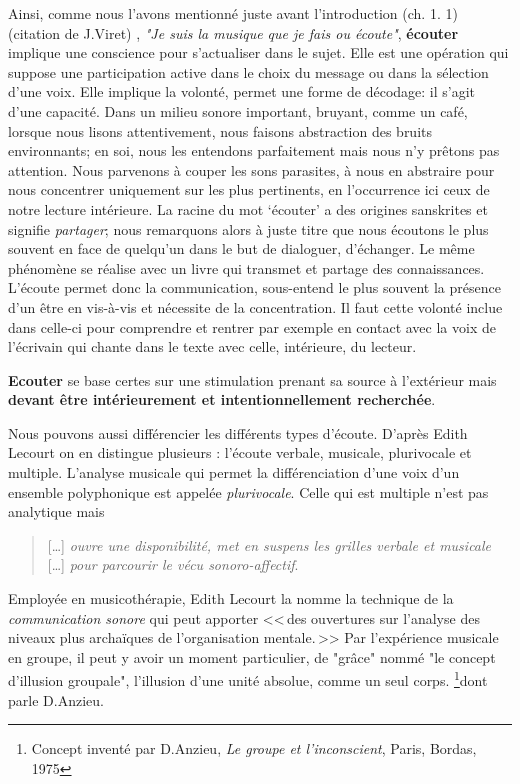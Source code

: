 Ainsi, comme nous l'avons mentionné juste avant l'introduction (ch. 1. 1) (citation de J.Viret) , \emph{"Je suis la musique que je fais ou écoute"}, \textbf{écouter} implique une conscience pour s'actualiser dans le sujet. Elle est une opération qui suppose une participation active dans le choix du message
ou dans la sélection d'une voix. Elle  implique la volonté,
permet une forme de décodage: il s'agit d'une capacité. Dans un milieu sonore important, bruyant, comme un café, lorsque nous lisons attentivement, nous faisons abstraction
des bruits environnants; en soi, nous les entendons parfaitement mais nous n'y
prêtons pas attention. Nous parvenons à couper les sons parasites, à nous en abstraire pour
nous concentrer uniquement sur les plus  pertinents, en l'occurrence ici ceux de notre lecture intérieure.
 La racine du mot `écouter' a des origines sanskrites et signifie \emph{partager}; nous remarquons alors à juste titre que nous écoutons le plus souvent en face de quelqu'un dans le but de dialoguer, d'échanger. Le même phénomène se réalise avec un livre qui transmet et partage des connaissances. L'écoute permet donc la communication, sous-entend le plus souvent la présence d'un être en vis-à-vis et nécessite de la  concentration. Il faut cette volonté inclue dans celle-ci  pour comprendre et rentrer par exemple en contact avec la voix de  l'écrivain qui chante dans le texte avec celle, intérieure,  du lecteur.
 
 
 \textbf{Ecouter} se base certes sur une stimulation prenant sa source à 
l'extérieur mais \textbf{devant être intérieurement et  intentionnellement
	recherchée}.




Nous pouvons aussi différencier les différents types d'écoute. D'après Edith Lecourt \autocite[ch. 10 <<\,De l'écoute verbale à l'écoute musicale\,>>, p. 182.]{lecourt:decouvrir}
 on en distingue plusieurs : l'écoute verbale, musicale, plurivocale et multiple.
 L'analyse musicale qui permet la différenciation d'une voix d'un ensemble polyphonique est appelée \emph{plurivocale}. Celle qui est multiple n'est pas analytique  mais 
 \begin{quote}
 	 [\ldots] \textit{ouvre une disponibilité, met en suspens les grilles verbale et musicale} [\ldots] \emph{pour parcourir le vécu sonoro-affectif}\autocite[p. 183]{lecourt:decouvrir}.
 \end{quote}
 Employée en musicothérapie, Edith Lecourt la nomme  la technique de la  \emph{communication sonore} qui peut apporter 
 <<\,des ouvertures sur l'analyse des niveaux plus archaïques de l'organisation mentale.\,>>\autocite[p. 154]{lecourt:decouvrir}	
 Par l'expérience musicale en groupe, il peut y avoir un moment particulier, de "grâce"  nommé "le concept d'illusion groupale", l'illusion d'une unité absolue, comme un seul corps. \footnote{Concept inventé par D.Anzieu, \textit{Le groupe et l'inconscient}, Paris, Bordas, 1975 }dont parle D.Anzieu.

